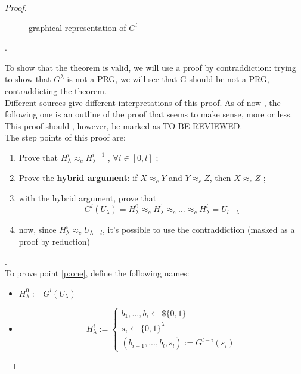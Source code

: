 \begin{proof}
\begin{figure}[h!]
\caption{graphical representation of $G^{l}$}
\label{fig:gpowerl}
\end{figure}.

To show that the theorem is valid, we will use a proof by contraddiction: trying
to show that $G^{\lambda}$ is not a PRG, we will see that G should be not a PRG,
contraddicting the theorem.\\

Different sources give different interpretations of this proof. As of now , the
following one is an outline of the proof that seems to make sense, more or less.
This proof should , however, be marked as TO BE REVIEWED.\\

The step points of this proof are:
\begin{enumerate}
    \item\label{p:one} Prove that $H_{\lambda}^{i} \approx_{c} H_{\lambda}^{i+1}$ , $ \forall
        i \in [0,l]$ ;
    \item \label{p:two}Prove the \textbf{hybrid argument}: if $X \approx_{c} Y$ and $Y
        \approx_{c} Z$, then $X \approx_{c} Z$ ;
    \item \label{p:three}with the hybrid argument, prove that 
        \[
            G^{l}(U_{\lambda})= H_{\lambda}^{0} \approx_{c} 
            H_{\lambda}^{1} \approx_{c} ... \approx_{c} 
            H_{\lambda}^{l} = U_{l+\lambda}
        \] 
    \item \label{p:four} now, since $H_{\lambda}^{i}
        \approx_{c} U_{\lambda + l}$,
         it's possible to use the contraddiction
        (masked as a proof by reduction)
\end{enumerate}.\\

To prove point \ref{p:one}, define the following names:
\begin{itemize}
    \item $H_{\lambda}^{0} := G^{l}(U_{\lambda})$
    \item 
            \[  H_{\lambda}^{i}:=\begin{cases}
                        b_1 , ..., b_{i} \leftarrow\$ \{0,1\} \\
                        s_{i} \leftarrow \{0,1\}^{\lambda} \\
                        (b_{i+1}, ..., b_{l}, s_{l}) := G^{l-i}(s_{i})
                        \end{cases} 
            \] 
            


\end{itemize}
\end{proof}
